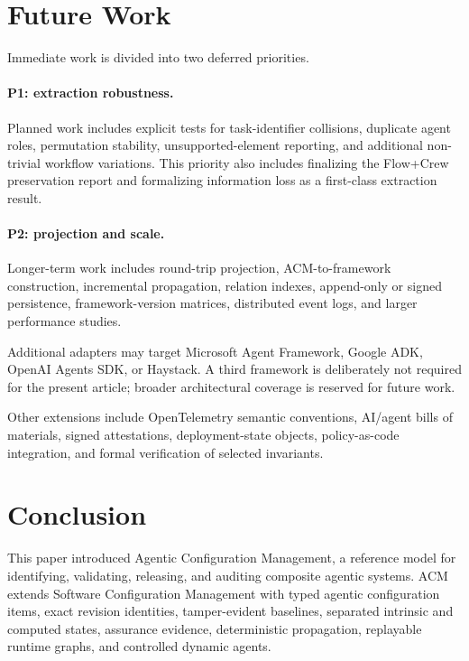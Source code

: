 \documentclass[10pt]{article}
\begin{document}
\section{Future Work}
\label{sec:future}

Immediate work is divided into two deferred priorities.

\paragraph{P1: extraction robustness.}
Planned work includes explicit tests for task-identifier collisions, duplicate agent roles, permutation stability, unsupported-element reporting, and additional non-trivial workflow variations. This priority also includes finalizing the Flow+Crew preservation report and formalizing information loss as a first-class extraction result.

\paragraph{P2: projection and scale.}
Longer-term work includes round-trip projection, ACM-to-framework construction, incremental propagation, relation indexes, append-only or signed persistence, framework-version matrices, distributed event logs, and larger performance studies.

Additional adapters may target Microsoft Agent Framework, Google ADK, OpenAI Agents SDK, or Haystack. A third framework is deliberately not required for the present article; broader architectural coverage is reserved for future work.

Other extensions include OpenTelemetry semantic conventions, AI/agent bills of materials, signed attestations, deployment-state objects, policy-as-code integration, and formal verification of selected invariants.

\section{Conclusion}

This paper introduced Agentic Configuration Management, a reference model for identifying, validating, releasing, and auditing composite agentic systems. ACM extends Software Configuration Management with typed agentic configuration items, exact revision identities, tamper-evident baselines, separated intrinsic and computed states, assurance evidence, deterministic propagation, replayable runtime graphs, and controlled dynamic agents.
\end{document}
